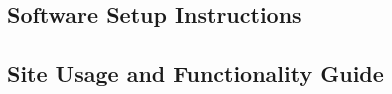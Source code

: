 \documentclass[../report.tex]{subfiles}
\begin{document}
   

\subsection{Software Setup Instructions}


\subsection{Site Usage and Functionality Guide}


\end{document}
